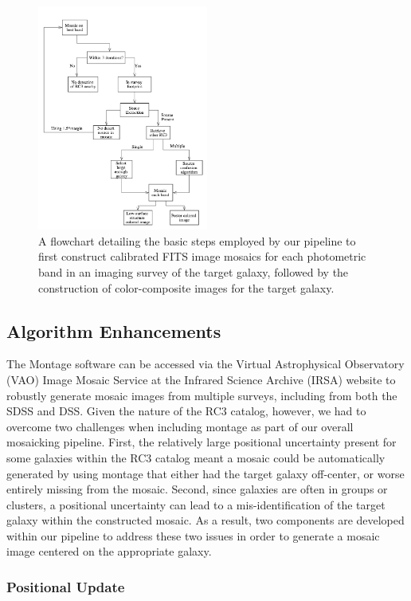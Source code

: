 \documentclass[authoryear, 12pt, 5p, times]{elsarticle}
\begin{document}
\begin{figure}[h]
\includegraphics[width=0.5\textwidth]{figures/algorithm.png}
\caption{ A flowchart detailing the basic steps employed by our pipeline to first construct calibrated FITS image mosaics for each photometric band in an imaging survey of the target galaxy, followed by the construction of color-composite images for the target galaxy.}
\label{flowchart}
\end{figure}

\subsection{Algorithm Enhancements}

The Montage software can be accessed via the Virtual Astrophysical Observatory (VAO) Image Mosaic Service at the Infrared Science Archive (IRSA) website to robustly generate mosaic images from multiple surveys, including from both the SDSS and DSS. Given the nature of the RC3 catalog, however, we had to overcome two challenges when including montage as part of our overall mosaicking pipeline. First, the relatively large positional uncertainty present for some galaxies within the RC3 catalog meant a mosaic could be automatically generated by using montage that either had the target galaxy off-center, or worse entirely missing from the mosaic. Second, since galaxies are often in groups or clusters, a positional uncertainty can lead to a mis-identification of the target galaxy within the constructed mosaic. As a result, two components are developed within our pipeline to address these two issues in order to generate a mosaic image centered on the appropriate galaxy.

\subsubsection{Positional Update\label{pos-sec}} 
\end{document}
